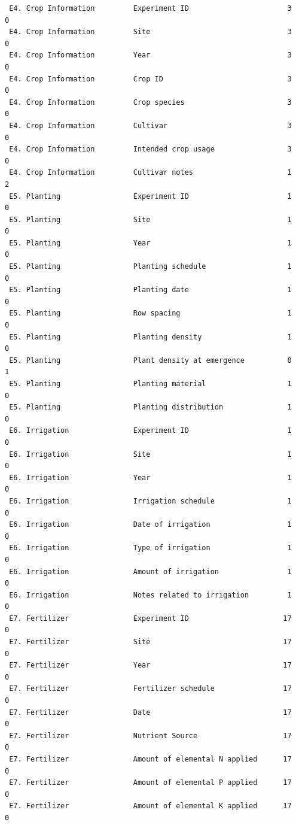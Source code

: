 \documentclass[
]{article}
\begin{document}
\begin{verbatim}
 E4. Crop Information         Experiment ID                       3       0
 E4. Crop Information         Site                                3       0
 E4. Crop Information         Year                                3       0
 E4. Crop Information         Crop ID                             3       0
 E4. Crop Information         Crop species                        3       0
 E4. Crop Information         Cultivar                            3       0
 E4. Crop Information         Intended crop usage                 3       0
 E4. Crop Information         Cultivar notes                      1       2
 E5. Planting                 Experiment ID                       1       0
 E5. Planting                 Site                                1       0
 E5. Planting                 Year                                1       0
 E5. Planting                 Planting schedule                   1       0
 E5. Planting                 Planting date                       1       0
 E5. Planting                 Row spacing                         1       0
 E5. Planting                 Planting density                    1       0
 E5. Planting                 Plant density at emergence          0       1
 E5. Planting                 Planting material                   1       0
 E5. Planting                 Planting distribution               1       0
 E6. Irrigation               Experiment ID                       1       0
 E6. Irrigation               Site                                1       0
 E6. Irrigation               Year                                1       0
 E6. Irrigation               Irrigation schedule                 1       0
 E6. Irrigation               Date of irrigation                  1       0
 E6. Irrigation               Type of irrigation                  1       0
 E6. Irrigation               Amount of irrigation                1       0
 E6. Irrigation               Notes related to irrigation         1       0
 E7. Fertilizer               Experiment ID                      17       0
 E7. Fertilizer               Site                               17       0
 E7. Fertilizer               Year                               17       0
 E7. Fertilizer               Fertilizer schedule                17       0
 E7. Fertilizer               Date                               17       0
 E7. Fertilizer               Nutrient Source                    17       0
 E7. Fertilizer               Amount of elemental N applied      17       0
 E7. Fertilizer               Amount of elemental P applied      17       0
 E7. Fertilizer               Amount of elemental K applied      17       0

\end{verbatim}
\end{document}
